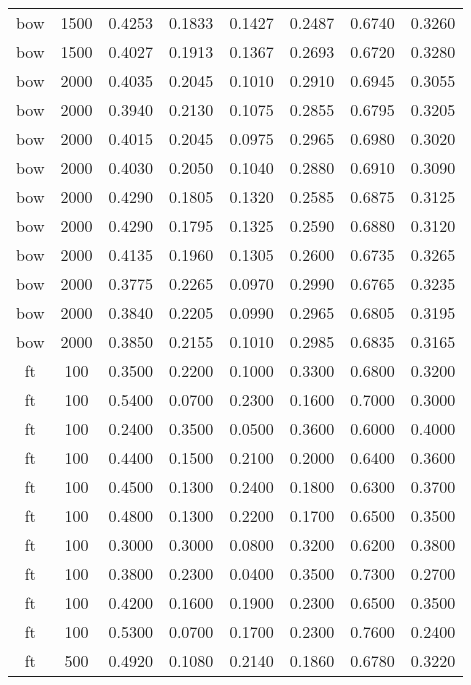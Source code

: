 \begin{table}[h!]
\begin{tabularx}{\textwidth}{cccccccc}
		bow      & 1500 & 0.4253 & 0.1833 & 0.1427 & 0.2487 & 0.6740 & 0.3260 \\
		bow      & 1500 & 0.4027 & 0.1913 & 0.1367 & 0.2693 & 0.6720 & 0.3280 \\
		bow      & 2000 & 0.4035 & 0.2045 & 0.1010 & 0.2910 & 0.6945 & 0.3055 \\
		bow      & 2000 & 0.3940 & 0.2130 & 0.1075 & 0.2855 & 0.6795 & 0.3205 \\
		bow      & 2000 & 0.4015 & 0.2045 & 0.0975 & 0.2965 & 0.6980 & 0.3020 \\
		bow      & 2000 & 0.4030 & 0.2050 & 0.1040 & 0.2880 & 0.6910 & 0.3090 \\
		bow      & 2000 & 0.4290 & 0.1805 & 0.1320 & 0.2585 & 0.6875 & 0.3125 \\
		bow      & 2000 & 0.4290 & 0.1795 & 0.1325 & 0.2590 & 0.6880 & 0.3120 \\
		bow      & 2000 & 0.4135 & 0.1960 & 0.1305 & 0.2600 & 0.6735 & 0.3265 \\
		bow      & 2000 & 0.3775 & 0.2265 & 0.0970 & 0.2990 & 0.6765 & 0.3235 \\
		bow      & 2000 & 0.3840 & 0.2205 & 0.0990 & 0.2965 & 0.6805 & 0.3195 \\
		bow      & 2000 & 0.3850 & 0.2155 & 0.1010 & 0.2985 & 0.6835 & 0.3165 \\
		ft       & 100  & 0.3500 & 0.2200 & 0.1000 & 0.3300 & 0.6800 & 0.3200 \\
		ft       & 100  & 0.5400 & 0.0700 & 0.2300 & 0.1600 & 0.7000 & 0.3000 \\
		ft       & 100  & 0.2400 & 0.3500 & 0.0500 & 0.3600 & 0.6000 & 0.4000 \\
		ft       & 100  & 0.4400 & 0.1500 & 0.2100 & 0.2000 & 0.6400 & 0.3600 \\
		ft       & 100  & 0.4500 & 0.1300 & 0.2400 & 0.1800 & 0.6300 & 0.3700 \\
		ft       & 100  & 0.4800 & 0.1300 & 0.2200 & 0.1700 & 0.6500 & 0.3500 \\
		ft       & 100  & 0.3000 & 0.3000 & 0.0800 & 0.3200 & 0.6200 & 0.3800 \\
		ft       & 100  & 0.3800 & 0.2300 & 0.0400 & 0.3500 & 0.7300 & 0.2700 \\
		ft       & 100  & 0.4200 & 0.1600 & 0.1900 & 0.2300 & 0.6500 & 0.3500 \\
		ft       & 100  & 0.5300 & 0.0700 & 0.1700 & 0.2300 & 0.7600 & 0.2400 \\
		ft       & 500  & 0.4920 & 0.1080 & 0.2140 & 0.1860 & 0.6780 & 0.3220 \\

\end{tabularx}
\end{table}
